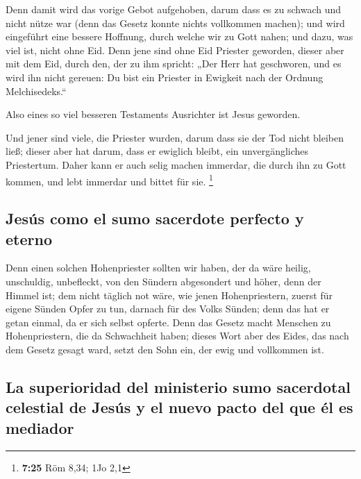  Denn damit wird das vorige Gebot aufgehoben, darum dass
es zu schwach und nicht nütze war  (denn das Gesetz
konnte nichts vollkommen machen); und wird eingeführt eine bessere
Hoffnung, durch welche wir zu Gott nahen;  und dazu, was
viel ist, nicht ohne Eid. Denn jene sind ohne Eid Priester geworden,
 dieser aber mit dem Eid, durch den, der zu ihm spricht:
„Der Herr hat geschworen, und es wird ihn nicht gereuen: Du bist ein
Priester in Ewigkeit nach der Ordnung Melchisedeks.``

 Also eines so viel besseren Testaments Ausrichter ist
Jesus geworden.

 Und jener sind viele, die Priester wurden, darum dass
sie der Tod nicht bleiben ließ;  dieser aber hat darum,
dass er ewiglich bleibt, ein unvergängliches Priestertum.
 Daher kann er auch selig machen immerdar, die durch ihn
zu Gott kommen, und lebt immerdar und bittet für sie. \footnote{\textbf{7:25}
  Röm 8,34; 1Jo 2,1}

\hypertarget{jesuxfas-como-el-sumo-sacerdote-perfecto-y-eterno}{%
\subsection{Jesús como el sumo sacerdote perfecto y
eterno}\label{jesuxfas-como-el-sumo-sacerdote-perfecto-y-eterno}}

 Denn einen solchen Hohenpriester sollten wir haben, der
da wäre heilig, unschuldig, unbefleckt, von den Sündern abgesondert und
höher, denn der Himmel ist;  dem nicht täglich not wäre,
wie jenen Hohenpriestern, zuerst für eigene Sünden Opfer zu tun, darnach
für des Volks Sünden; denn das hat er getan einmal, da er sich selbst
opferte.  Denn das Gesetz macht Menschen zu
Hohenpriestern, die da Schwachheit haben; dieses Wort aber des Eides,
das nach dem Gesetz gesagt ward, setzt den Sohn ein, der ewig und
vollkommen ist.

\hypertarget{la-superioridad-del-ministerio-sumo-sacerdotal-celestial-de-jesuxfas-y-el-nuevo-pacto-del-que-uxe9l-es-mediador}{%
\subsection{La superioridad del ministerio sumo sacerdotal celestial de
Jesús y el nuevo pacto del que él es
mediador}\label{la-superioridad-del-ministerio-sumo-sacerdotal-celestial-de-jesuxfas-y-el-nuevo-pacto-del-que-uxe9l-es-mediador}}

